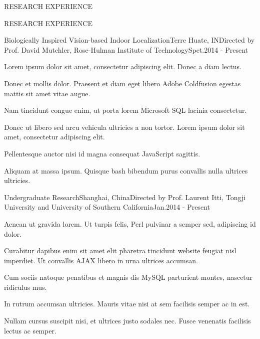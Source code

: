 \documentclass{resume} %
\begin{document}
\begin{rSection}{RESEARCH EXPERIENCE}
\end{rSection}


\begin{rSection}{RESEARCH EXPERIENCE}

  \begin{rSubsection}{Biologically Inspired Vision-based Indoor Localization}{Terre Huate, IN}{Directed by Prof. David
    Mutchler, Rose-Hulman Institute of Technology}{Spet.2014 - Present}
  \item Lorem ipsum dolor sit amet, consectetur adipiscing elit. Donec a diam lectus.
  \item Donec et mollis dolor. Praesent et diam eget libero Adobe Coldfusion egestas mattis sit amet vitae augue.
  \item Nam tincidunt congue enim, ut porta lorem Microsoft SQL lacinia consectetur.
  \item Donec ut libero sed arcu vehicula ultricies a non tortor. Lorem ipsum dolor sit amet, consectetur adipiscing elit.
  \item Pellentesque auctor nisi id magna consequat JavaScript sagittis.
  \item Aliquam at massa ipsum. Quisque bash bibendum purus convallis nulla ultrices ultricies.
  \end{rSubsection}


  \begin{rSubsection}{Undergraduate Research}{Shanghai, China}{Directed by Prof. Laurent Itti, Tongji
    University and University of Southern California}{Jan.2014 - Present}
  \item Aenean ut gravida lorem. Ut turpis felis, Perl pulvinar a semper sed, adipiscing id dolor.
  \item Curabitur dapibus enim sit amet elit pharetra tincidunt website feugiat nisl imperdiet. Ut convallis AJAX libero in urna ultrices accumsan.
  \item Cum sociis natoque penatibus et magnis dis MySQL parturient montes, nascetur ridiculus mus.
  \item In rutrum accumsan ultricies. Mauris vitae nisi at sem facilisis semper ac in est.
  \item Nullam cursus suscipit nisi, et ultrices justo sodales nec. Fusce venenatis facilisis lectus ac semper.
  \end{rSubsection}


\end{rSection}
\end{document}
